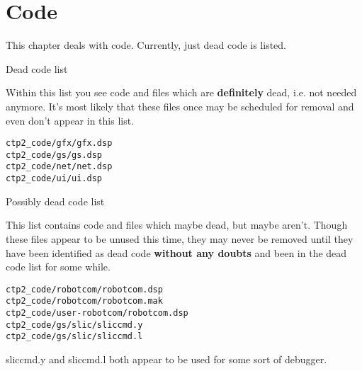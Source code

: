 \chapter{Code\label{cha:code}}
This chapter deals with code. Currently, just dead code is listed.
\begin{section}{Dead code list}

Within this list you see code and files which are \textbf{definitely} dead, i.e. not needed anymore. It's most likely that these files once may be scheduled for removal and even don't appear in this list.

\begin{verbatim}
ctp2_code/gfx/gfx.dsp
ctp2_code/gs/gs.dsp
ctp2_code/net/net.dsp
ctp2_code/ui/ui.dsp
\end{verbatim}

\end{section}%

\begin{section}{Possibly dead code list}

This list contains code and files which maybe dead, but maybe aren't. Though these files appear to be unused this time, they may never be removed until they have been identified as dead code \textbf{without any doubts} and been in the dead code list for some while.

\begin{verbatim}
ctp2_code/robotcom/robotcom.dsp
ctp2_code/robotcom/robotcom.mak
ctp2_code/user-robotcom/robotcom.dsp
ctp2_code/gs/slic/sliccmd.y
ctp2_code/gs/slic/sliccmd.l
\end{verbatim}

sliccmd.y and sliccmd.l both appear to be used for some sort of debugger.

\end{section}%

